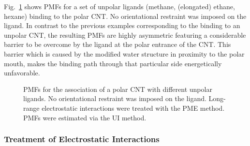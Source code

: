 \documentclass[9pt,lessons]{livecoms}
\begin{document}
Fig.~\ref{fig:polCNT_unpLig} shows PMFs for a set of unpolar ligands (methane, (elongated) ethane, hexane) binding to the polar CNT. 
No orientational restraint was imposed on the ligand.
In contrast to the previous examples corresponding to the binding to an unpolar CNT, the resulting PMFs are highly asymmetric featuring a considerable barrier to be overcome by the ligand at the polar entrance of the CNT. 
This barrier which is caused by the modified water structure in proximity to the polar mouth, makes the binding path through that particular side energetically unfavorable.
\begin{figure}
  \centering    
  \caption{
  PMFs for the association of a polar CNT with different unpolar ligands. No orientational restraint was imposed on the ligand. 
  Long-range electrostatic interactions were treated with the PME method. PMFs were estimated via the UI method.
  }
  \label{fig:polCNT_unpLig}
\end{figure}

\subsubsection*{Treatment of Electrostatic Interactions}
\end{document}

